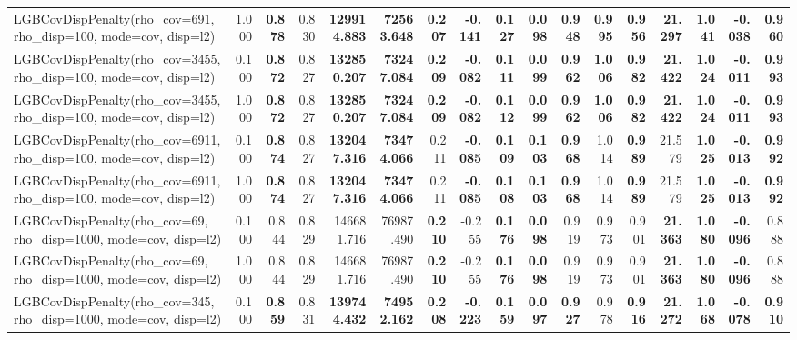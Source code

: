 \documentclass[11pt]{article}
\theoremstyle{plain}
\theoremstyle{definition}
\newcommand{\1}{\mathbf{1}}
\begin{document}
\begin{table}[htbp]
{\begin{tabular}{lrrrrrrrrrrrrrrrr}
LGBCovDispPenalty(rho_cov=691, rho_disp=100, mode=cov, disp=l2) & 1.000 & \textbf{0.878} & 0.830 & \textbf{129914.883} & \textbf{72563.648} & \textbf{0.207} & \textbf{-0.141} & \textbf{0.127} & \textbf{0.098} & \textbf{0.948} & \textbf{0.995} & \textbf{0.956} & \textbf{21.297} & \textbf{1.041} & \textbf{-0.038} & \textbf{0.960} \\
LGBCovDispPenalty(rho_cov=3455, rho_disp=100, mode=cov, disp=l2) & 0.100 & \textbf{0.872} & 0.827 & \textbf{132850.207} & \textbf{73247.084} & \textbf{0.209} & \textbf{-0.082} & \textbf{0.111} & \textbf{0.099} & \textbf{0.962} & \textbf{1.006} & \textbf{0.982} & \textbf{21.422} & \textbf{1.024} & \textbf{-0.011} & \textbf{0.993} \\
LGBCovDispPenalty(rho_cov=3455, rho_disp=100, mode=cov, disp=l2) & 1.000 & \textbf{0.872} & 0.827 & \textbf{132850.207} & \textbf{73247.084} & \textbf{0.209} & \textbf{-0.082} & \textbf{0.112} & \textbf{0.099} & \textbf{0.962} & \textbf{1.006} & \textbf{0.982} & \textbf{21.422} & \textbf{1.024} & \textbf{-0.011} & \textbf{0.993} \\
LGBCovDispPenalty(rho_cov=6911, rho_disp=100, mode=cov, disp=l2) & 0.100 & \textbf{0.874} & 0.827 & \textbf{132047.316} & \textbf{73474.066} & 0.211 & \textbf{-0.085} & \textbf{0.109} & \textbf{0.103} & \textbf{0.968} & 1.014 & \textbf{0.989} & 21.579 & \textbf{1.025} & \textbf{-0.013} & \textbf{0.992} \\
LGBCovDispPenalty(rho_cov=6911, rho_disp=100, mode=cov, disp=l2) & 1.000 & \textbf{0.874} & 0.827 & \textbf{132047.316} & \textbf{73474.066} & 0.211 & \textbf{-0.085} & \textbf{0.108} & \textbf{0.103} & \textbf{0.968} & 1.014 & \textbf{0.989} & 21.579 & \textbf{1.025} & \textbf{-0.013} & \textbf{0.992} \\
LGBCovDispPenalty(rho_cov=69, rho_disp=1000, mode=cov, disp=l2) & 0.100 & 0.844 & 0.829 & 146681.716 & 76987.490 & \textbf{0.210} & -0.255 & \textbf{0.176} & \textbf{0.098} & 0.919 & 0.973 & 0.901 & \textbf{21.363} & \textbf{1.080} & \textbf{-0.096} & 0.888 \\
LGBCovDispPenalty(rho_cov=69, rho_disp=1000, mode=cov, disp=l2) & 1.000 & 0.844 & 0.829 & 146681.716 & 76987.490 & \textbf{0.210} & -0.255 & \textbf{0.176} & \textbf{0.098} & 0.919 & 0.973 & 0.901 & \textbf{21.363} & \textbf{1.080} & \textbf{-0.096} & 0.888 \\
LGBCovDispPenalty(rho_cov=345, rho_disp=1000, mode=cov, disp=l2) & 0.100 & \textbf{0.859} & 0.831 & \textbf{139744.432} & \textbf{74952.162} & \textbf{0.208} & \textbf{-0.223} & \textbf{0.159} & \textbf{0.097} & \textbf{0.927} & 0.978 & \textbf{0.916} & \textbf{21.272} & \textbf{1.068} & \textbf{-0.078} & \textbf{0.910} \\

\end{tabular}}
\end{table}
\end{document}
